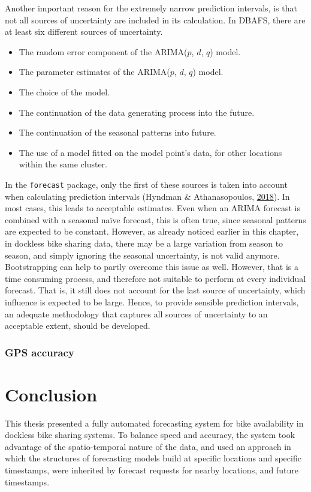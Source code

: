 \documentclass[12pt,oneside]{reedthesis}
\providecommand{\tightlist}{%
  \setlength{\itemsep}{0pt}\setlength{\parskip}{0pt}}
\begin{document}
Another important reason for the extremely narrow prediction intervals,
is that not all sources of uncertainty are included in its calculation.
In DBAFS, there are at least six different sources of uncertainty.
\begin{itemize}
\tightlist
\item
  The random error component of the ARIMA(\(p\), \(d\), \(q\)) model.
\item
  The parameter estimates of the ARIMA(\(p\), \(d\), \(q\)) model.
\item
  The choice of the model.
\item
  The continuation of the data generating process into the future.
\item
  The continuation of the seasonal patterns into future.
\item
  The use of a model fitted on the model point's data, for other
  locations within the same cluster.
\end{itemize}
In the \texttt{forecast} package, only the first of these sources is
taken into account when calculating prediction intervals (Hyndman \&
Athanasopoulos, \protect\hyperlink{ref-hyndman2018fpp}{2018}). In most
cases, this leads to acceptable estimates. Even when an ARIMA forecast
is combined with a seasonal naïve forecast, this is often true, since
seasonal patterns are expected to be constant. However, as already
noticed earlier in this chapter, in dockless bike sharing data, there
may be a large variation from season to season, and simply ignoring the
seasonal uncertainty, is not valid anymore. Bootstrapping can help to
partly overcome this issue as well. However, that is a time consuming
process, and therefore not suitable to perform at every individual
forecast. That is, it still does not account for the last source of
uncertainty, which influence is expected to be large. Hence, to provide
sensible prediction intervals, an adequate methodology that captures all
sources of uncertainty to an acceptable extent, should be developed.

\subsection{GPS accuracy}\label{gps-accuracy}

\chapter{Conclusion}\label{conclusion}

This thesis presented a fully automated forecasting system for bike
availability in dockless bike sharing systems. To balance speed and
accuracy, the system took advantage of the spatio-temporal nature of the
data, and used an approach in which the structures of forecasting models
build at specific locations and specific timestamps, were inherited by
forecast requests for nearby locations, and future timestamps.
\end{document}

